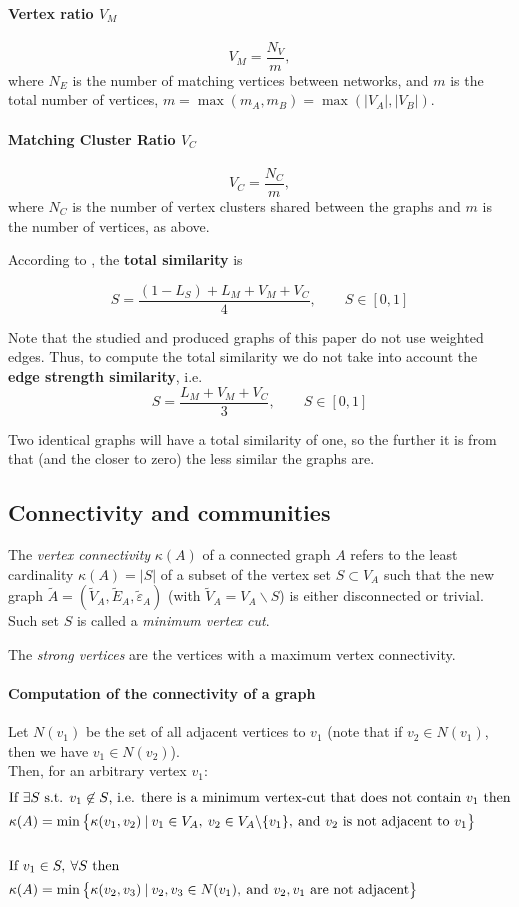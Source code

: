 \documentclass[english, 12pt]{article}
\begin{document}
\paragraph{Vertex ratio $V_M$}
\[V_M = \frac{N_V}{m},\]
where $N_E$ is the number of matching vertices between networks, and $m$ is the total number of vertices, $m = \max(m_A,m_B)=  \max(|V_A|, |V_B|)$.

\paragraph{Matching Cluster Ratio $V_C$}
\[V_C = \frac{N_C}{m},\]
where $N_C$ is the number of vertex clusters shared between the graphs and $m$ is the number of vertices, as above.

According to \cite{2019osti}, the {\bf total similarity} is

$$S = \dfrac{(1-L_S) + L_M + V_M + V_C}{4},\qquad S \in [0,1]$$

Note that the studied and produced graphs of this paper do not use weighted edges. Thus, to compute the total similarity we do not take into account the {\bf edge strength similarity},
i.e.
$$S = \dfrac{L_M + V_M + V_C}{3},\qquad S \in [0,1]$$

Two identical graphs will have a total similarity of one, so the further it is from that (and the closer to zero) the less similar the graphs are.

\subsection{Connectivity and communities}

The {\it vertex connectivity} $\kappa(A)$ of a connected graph $A$ refers to the least cardinality $\kappa(A) = |S|$ of a subset of the vertex set $S \subset V_A$ such that the new graph $\tilde A = (\tilde V_A, \tilde E_A, \tilde \varepsilon_A)$ (with $\tilde V_A = V_A \backslash S$) is either disconnected or trivial.
Such set $S$ is called a {\it minimum vertex cut}.

The {\it strong vertices} are the vertices with a maximum vertex connectivity.
%
\vspace{-.5cm} %
%
\paragraph{Computation of the connectivity of a graph}
Let $N(v_1)$ be the set of all adjacent vertices to $v_1$ (note that if $v_2\in N(v_1)$, then we have $v_1 \in N(v_2)$).\\
Then, for an arbitrary vertex $v_1$:
%
\begin{align*}
\shortintertext{If $\exists S$ s.t. $v_1 \not\in S$, i.e. there is a minimum vertex-cut that does not contain $v_1$ then}
  \kappa(A) &= \min\big\{\kappa(v_1,v_2) \:|\: v_1 \in V_A,\: v_2 \in V_A\backslash\{v_1\},\: \text{and $v_2$ is not adjacent to $v_1$}\big\}\\\\
\shortintertext{If $v_1 \in S,\: \forall S$ then}
  \kappa(A) &= \min\big\{\kappa(v_2,v_3) \:|\: v_2,v_3 \in N(v_1),\:\text{and $v_2,v_1$ are not adjacent}\big\}
\end{align*}
\end{document}
